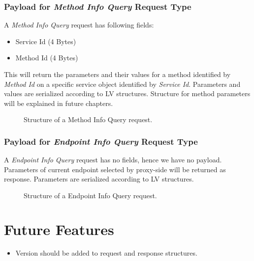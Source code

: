 \documentclass[10pt,a4paper]{article}
\begin{document}
\subsubsection {Payload for \textit{Method Info Query} Request Type}
A \textit{Method Info Query} request has following fields:
\begin{itemize}
  \item Service Id (4 Bytes)
  \item Method Id (4 Bytes)
\end{itemize}
This will return the parameters and their values for a method identified by \textit{Method Id} on a specific service object identified by \textit{Service Id}. Parameters and values are serialized according to LV structures. Structure for method parameters will be explained in future chapters.

\begin{figure}[!ht]
  \caption{Structure of a Method Info Query request.}
  \centering
\end{figure}

\subsubsection {Payload for \textit{Endpoint Info Query} Request Type}
A \textit{Endpoint Info Query} request has no fields, hence we have no payload. Parameters of current endpoint selected by proxy-side will be returned as response. Parameters are serialized according to LV structures.

\begin{figure}[!ht]
  \caption{Structure of a Endpoint Info Query request.}
  \centering
\end{figure}

\section {Future Features}
\begin{itemize}
  \item Version should be added to request and response structures.
\end{itemize}
\end{document}
